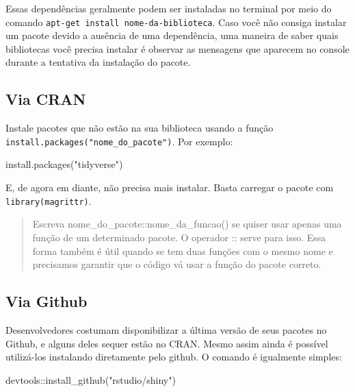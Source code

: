 \documentclass[
]{book}
\newenvironment{Shaded}{\begin{snugshade}}{\end{snugshade}}
\newcommand{\FunctionTok}[1]{\textcolor[rgb]{0.00,0.00,0.00}{#1}}
\newcommand{\NormalTok}[1]{#1}
\newcommand{\SpecialCharTok}[1]{\textcolor[rgb]{0.00,0.00,0.00}{#1}}
\newcommand{\StringTok}[1]{\textcolor[rgb]{0.31,0.60,0.02}{#1}}
\begin{document}
Essas dependências geralmente podem ser instaladas no terminal por meio do comando \texttt{apt-get\ install\ nome-da-biblioteca}. Caso você não consiga instalar um pacote devido a ausência de uma dependência, uma maneira de saber quais bibliotecas você precisa instalar é observar as mensagens que aparecem no console durante a tentativa da instalação do pacote.

\hypertarget{via-cran}{%
\subsection{Via CRAN}\label{via-cran}}

Instale pacotes que não estão na sua biblioteca usando a função \texttt{install.packages("nome\_do\_pacote")}. Por exemplo:

\begin{Shaded}
\begin{Highlighting}[]
\FunctionTok{install.packages}\NormalTok{(}\StringTok{"tidyverse"}\NormalTok{)}
\end{Highlighting}
\end{Shaded}

E, de agora em diante, não precisa mais instalar. Basta carregar o pacote com \texttt{library(magrittr)}.

\begin{quote}
Escreva nome\_do\_pacote::nome\_da\_funcao() se quiser usar apenas uma função de um determinado pacote. O operador :: serve para isso. Essa forma também é útil quando se tem duas funções com o mesmo nome e precisamos garantir que o código vá usar a função do pacote correto.
\end{quote}

\hypertarget{via-github}{%
\subsection{Via Github}\label{via-github}}

Desenvolvedores costumam disponibilizar a última versão de seus pacotes no Github, e alguns deles sequer estão no CRAN. Mesmo assim ainda é possível utilizá-los instalando diretamente pelo github. O comando é igualmente simples:

\begin{Shaded}
\begin{Highlighting}[]
\NormalTok{devtools}\SpecialCharTok{::}\FunctionTok{install\_github}\NormalTok{(}\StringTok{"rstudio/shiny"}\NormalTok{)}
\end{Highlighting}
\end{Shaded}
\end{document}
